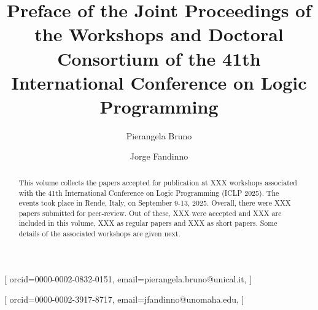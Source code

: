 \documentclass[
]{ceurart}
\begin{document}


\title{Preface of the Joint Proceedings of the Workshops and Doctoral Consortium of the 41th International Conference on Logic Programming}


\author[1]{Pierangela Bruno}[%
orcid=0000-0002-0832-0151,
email=pierangela.bruno@unical.it,
]
\address[2]{University of Calabria, Italy}


\author[2]{Jorge Fandinno}[%
orcid=0000-0002-3917-8717,
email=jfandinno@unomaha.edu,
]
\address[2]{University of Nebraska Omaha, USA}

\def\changemargin#1#2{\list{}{\rightmargin#2\leftmargin#1}\item[]}
\let\endchangemargin=\endlist 


\newcommand{\workshop}[3]{\section{#2}\vspace{-8pt}\begin{changemargin}{19pt}{8pt} 
\rm\normalsize\it #1 #2 (#3)\end{changemargin}}


\begin{abstract}
This volume collects the papers accepted for publication at XXX workshops associated with the 41th International Conference on Logic Programming (ICLP 2025).
%
The events took place in Rende, Italy, on September 9-13, 2025.
%
Overall, there were XXX papers submitted for peer-review.
%
Out of these, XXX were accepted and XXX are included in this volume, XXX as regular papers and XXX as short papers. Some details of the associated workshops are given next.
\end{abstract}

\maketitle
\end{document}
